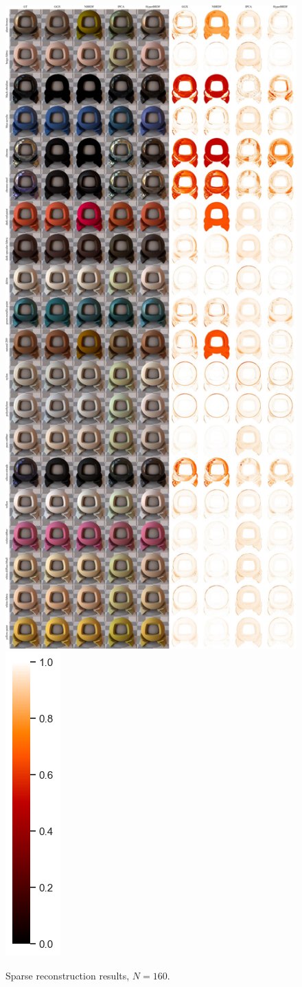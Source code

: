 \begin{figure}[ht]
  \centering

  {\includegraphics[width=0.65\linewidth]{Chapters/appendix-figs/supp_160-compressed.pdf}}
  {\includegraphics[width=0.02\linewidth]{Chapters/hyperbrdf-figs/vbar.png}}
   \caption{Sparse reconstruction results, $N = 160$.}
   \label{fig:160}
\end{figure}

